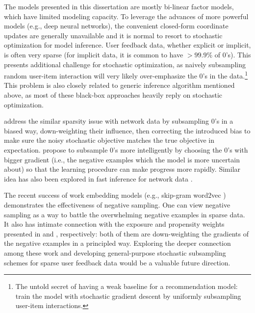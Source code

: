 The models presented in this dissertation are mostly bi-linear factor models, which have limited modeling capacity. To leverage the advances of more powerful models (e.g., deep neural networks), the convenient closed-form coordinate updates are generally unavailable and it is normal to resort to stochastic optimization for model inference. User feedback data, whether explicit or implicit, is often very sparse (for implicit data, it is common to have $>99.9\%$ of 0's). This presents additional challenge for stochastic optimization, as naively subsampling random user-item interaction will very likely over-emphasize the 0's in the data.\footnote{The untold secret of having a weak baseline for a recommendation model: train the model with stochastic gradient descent by uniformly subsampling user-item interactions.} This problem is also closely related to generic inference algorithm mentioned above, as most of these black-box approaches heavily reply on stochastic optimization.

\citet{gopalan2013efficient} address the similar sparsity issue with network data by subsampling 0's in a biased way, down-weighting their influence, then correcting the introduced bias to make sure the noisy stochastic objective matches the true objective in expectation. 
\citet{rendle2014improving} propose to subsample 0's more intelligently by choosing the 0's with bigger gradient (i.e., the negative examples which the model is more uncertain about) so that the learning procedure can make progress more rapidly. Similar idea has also been explored in fast inference for network data \citep{raftery2012fast}. 

The recent success of work embedding models (e.g., skip-gram word2vec \citep{mikolov2013distributed}) demonstrates the effectiveness of negative sampling. One can view negative sampling as a way to battle the overwhelming negative examples in sparse data. It also has intimate connection with the exposure and propensity weights presented in  and , respectively: both of them are down-weighting the gradients of the negative examples in a principled way. Exploring the deeper connection among these work and developing general-purpose stochastic subsampling schemes for sparse user feedback data would be a valuable future direction. 

